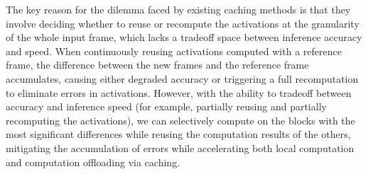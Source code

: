 The key reason for the dilemma faced by existing caching methods is that they involve deciding whether to reuse or recompute the activations at the granularity of the whole input frame, which lacks a tradeoff space between inference accuracy and speed.
When continuously reusing activations computed with a reference frame, the difference between the new frames and the reference frame accumulates, causing either degraded accuracy or triggering a full recomputation to eliminate errors in activations. 
However, with the ability to tradeoff between accuracy and inference speed (for example, partially reusing and partially recomputing the activations), we can selectively compute on the blocks with the most significant differences while reusing the computation results of the others, mitigating the accumulation of errors while accelerating both local computation and computation offloading via caching.




